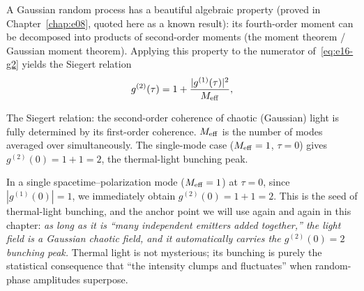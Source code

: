A Gaussian random process has a beautiful algebraic property (proved in Chapter~\ref{chap:e08}, quoted here as a known result): its fourth-order moment can be decomposed into products of second-order moments (the moment theorem / Gaussian moment theorem). Applying this property to the numerator of~\eqref{eq:e16-g2} yields the Siegert relation
\begin{equation}
  g^{(2)}(\tau)=1+\frac{|g^{(1)}(\tau)|^2}{M_{\rm eff}},
  \label{eq:e16-siegert}
\end{equation}
\begin{formulaexplain}
The Siegert relation: the second-order coherence of chaotic (Gaussian) light is fully determined by its first-order coherence. \(M_{\rm eff}\) is the number of modes averaged over simultaneously. The single-mode case (\(M_{\rm eff}=1\), \(\tau=0\)) gives \(g^{(2)}(0)=1+1=2\), the thermal-light bunching peak.
\end{formulaexplain}
In a single spacetime--polarization mode (\(M_{\rm eff}=1\)) at \(\tau=0\), since \(|g^{(1)}(0)|=1\), we immediately obtain \(g^{(2)}(0)=1+1=2\). This is the seed of thermal-light bunching, and the anchor point we will use again and again in this chapter: \emph{as long as it is ``many independent emitters added together,'' the light field is a Gaussian chaotic field, and it automatically carries the \(g^{(2)}(0)=2\) bunching peak.} Thermal light is not mysterious; its bunching is purely the statistical consequence that ``the intensity clumps and fluctuates'' when random-phase amplitudes superpose.


